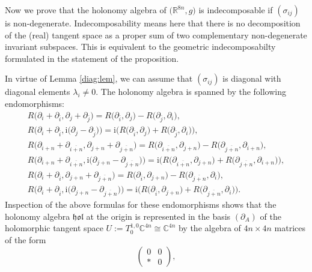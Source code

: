 \documentclass[pdftex]{sigma}
\numberwithin{equation}{section}
\newcommand{\C}{\ensuremath{\mathbb{C}}}
\newcommand{\1}{\mathbf{1}}
\newcommand{\+}{\oplus}
\renewcommand{\=}{\equiv}
\newcommand{\R}{\mathbb{R}}
\begin{document}
Now we prove that the holonomy algebra of $\bigl(\R^{8n},g\bigr)$ is indecomposable if $(\sigma_{ij})$ is non-degenerate.
Indecomposability means here that there is no decomposition of the (real) tangent space as a proper sum of two complementary non-degenerate invariant subspaces. This is equivalent to the geometric indecomposabilty formulated in the statement of the proposition.

In virtue of Lemma \ref{diag:lem}, we can assume that $(\sigma_{ij})$ is diagonal
with diagonal elements $\lambda_i\neq 0$.
The holonomy algebra is spanned by the following endomorphisms:
\begin{gather*}
R\bigl(\partial_i + \partial_{\bar i},\partial_j+\partial_{\bar j}\bigr) = R\bigl(\partial_{\bar i}, \partial_j\bigr) - R\bigl(\partial_{\bar j}, \partial_i\bigr),\\
R\bigl(\partial_i + \partial_{\bar i},\mathrm{i}\bigl(\partial_j-\partial_{\bar j}\bigr)\bigr) = \mathrm{i}\bigl(R\bigl(\partial_{\bar i}, \partial_j\bigr) +
R\bigl(\partial_{\bar j}, \partial_i\bigr)\bigr),\\
R\bigl(\partial_{i+n} + \partial_{\overline{i+n}},\partial_{j+n}+\partial_{\overline{j+n}}\bigr) = R\bigl(\partial_{\overline{i+n}}, \partial_{j+n}\bigr) - R\bigl(\partial_{\overline{j+n}}, \partial_{i+n}\bigr),\\
R\bigl(\partial_{i+n} + \partial_{\overline{i+n}},\mathrm{i}\bigl(\partial_{j+n}-\partial_{\overline{j+n}}\bigr)\bigr) = \mathrm{i}\bigl(R\bigl(\partial_{\overline{i+n}}, \partial_{j+n}\bigr) + R\bigl(\partial_{\overline{j+n}}, \partial_{i+n}\bigr)\bigr),\\
R\bigl(\partial_{i} + \partial_{\overline{i}},\partial_{j+n}+\partial_{\overline{j+n}}\bigr) = R\bigl(\partial_{\overline{i}}, \partial_{j+n}\bigr) - R\bigl(\partial_{\overline{j+n}}, \partial_{i}\bigr),\\
R\bigl(\partial_{i} + \partial_{\overline{i}},\mathrm{i}\bigl(\partial_{j+n}-\partial_{\overline{j+n}}\bigr)\bigr) = \mathrm{i}\bigl(R\bigl(\partial_{\overline{i}}, \partial_{j+n}\bigr) + R\bigl(\partial_{\overline{j+n}}, \partial_{i}\bigr)\bigr).
\end{gather*}
Inspection of the above formulas for these endomorphisms shows that the holonomy algebra $\mathfrak{hol}$ at the origin is represented
in the basis $(\partial_A)$ of the holomorphic tangent space ${U\!:=\!T_0^{1,0}\C^{4n}\cong \C^{4n}}$ by the algebra of $4n \times 4n$ matrices of the form
\[ \begin{pmatrix}0&0\\\ast &0\end{pmatrix},\]
\end{document}
